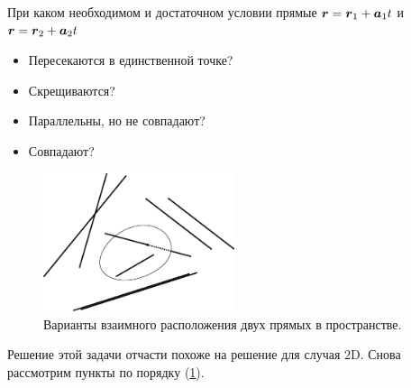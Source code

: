 \documentclass[a4paper,12pt]{article}
\begin{document}
  \begin{problem}
    При каком необходимом и достаточном условии прямые $\bds r \hm= \bds r_1 + \bds a_1 t$ и $\bds r \hm= \bds r_2 \hm+ \bds a_2 t$
    \begin{itemize}
      \item Пересекаются в единственной точке?
      \item Скрещиваются?
      \item Параллельны, но не совпадают?
      \item Совпадают?
    \end{itemize}
  \end{problem}
  
  \begin{solution}
    \begin{figure}[h]
      \centering
      
      \includegraphics[width=0.5\textwidth]{lines-in-3d}
      
      \caption{Варианты взаимного расположения двух прямых в пространстве.}
      \label{fig:lines-in-3d}
    \end{figure}
    
    Решение этой задачи отчасти похоже на решение для случая $2$D.
    Снова рассмотрим пункты по порядку (\ref{fig:lines-in-3d}).
    

\end{solution}
\end{document}
